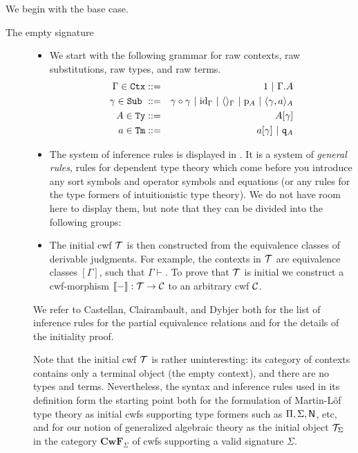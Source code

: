 \documentclass{lmcs}
\def\Cwf{\mathbf{CwF}}
\def\id{\mathrm{id}}
\begin{document}
We begin with the base case.
\begin{description}
\item[The empty signature] 
\begin{itemize}
\item 
We start with the following grammar for raw contexts, raw substitutions, raw types, and raw terms.
\begin{eqnarray*}
\Gamma \in \RawCtx &::=& 1  \ |\ \Gamma\cext A\\
\gamma \in \RawSub \ &::=& \gamma \circ \gamma \ |\ \id_\Gamma \ |\ \langle\rangle_\Gamma \ |\ \p_{A} \ |\ \langle \gamma, a \rangle_A\\
A \in \RawTy &::=& A[\gamma]\\
a \in \RawTm &::=& a[\gamma] \ |\ \qI_A
\end{eqnarray*}
\item
The system of inference rules is displayed in \cite{castellan:tlca2015,castellan:lmcs}. It is a system of {\em general rules}, rules for dependent type theory which come before you introduce any sort symbols and operator symbols and equations (or any rules for the type formers of intuitionistic type theory). We do not have room here to display them, but note that they can be divided into the following groups:

\item
The initial cwf ${\mathcal T}$ is then constructed from the equivalence classes of derivable judgments. For example, the contexts in ${\mathcal T}$ are equivalence classes $[\Gamma]$, such that $\Gamma \vdash$. To prove that ${\mathcal T}$ is initial we construct a cwf-morphism $\llbracket - \rrbracket : {\mathcal T} \to {\mathcal C}$ to an arbitrary cwf ${\mathcal C}$. \end{itemize}
We refer to Castellan, Clairambault, and Dybjer \cite{castellan:tlca2015,castellan:lmcs} both for the list of inference rules for the partial equivalence relations and for the details of the initiality proof.


Note that the initial cwf ${\mathcal T}$ is rather uninteresting: its category of contexts contains only a terminal object (the empty context), and there are no types and terms. Nevertheless, the syntax and inference rules used in its definition form the starting point both for the formulation of Martin-Löf type theory as initial cwfs supporting type formers such as $\Pi, \Sigma, \mathsf{N}$, etc, and for our notion of generalized algebraic theory as the initial object ${\mathcal T}_\Sigma$ in the category $\Cwf_\Sigma$ of cwfs supporting a valid signature $\Sigma$.

\end{description}
\end{document}
